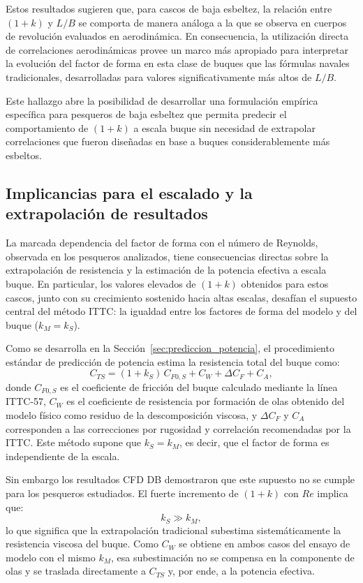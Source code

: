 Estos resultados sugieren que, para cascos de baja esbeltez, la relación entre $(1+k)$ y $L/B$ se comporta de manera análoga a la que se observa en cuerpos de revolución evaluados en aerodinámica. En consecuencia, la utilización directa de correlaciones aerodinámicas provee un marco más apropiado para interpretar la evolución del factor de forma en esta clase de buques que las fórmulas navales tradicionales, desarrolladas para valores significativamente más altos de $L/B$.

Este hallazgo abre la posibilidad de desarrollar una formulación empírica específica para pesqueros de baja esbeltez que permita predecir el comportamiento de $(1+k)$ a escala buque sin necesidad de extrapolar correlaciones que fueron diseñadas en base a buques considerablemente más esbeltos.


\subsection{Implicancias para el escalado y la extrapolación de resultados}

La marcada dependencia del factor de forma con el número de Reynolds, 
observada en los pesqueros analizados, tiene consecuencias directas sobre 
la extrapolación de resistencia y la estimación de la potencia efectiva a 
escala buque. En particular, los valores elevados de $(1+k)$ obtenidos para 
estos cascos, junto con su crecimiento sostenido hacia altas escalas, 
desafían el supuesto central del método ITTC: la igualdad entre los factores 
de forma del modelo y del buque ($k_{M} = k_{S}$).

Como se desarrolla en la Sección~\ref{sec:prediccion_potencia}, el 
procedimiento estándar de predicción de potencia \citep{ITTC_Performance_prediction} 
estima la resistencia total del buque como:
%
\begin{equation}
    C_{TS} = (1 + k_S)\,C_{F0,S} + C_W + \Delta C_F + C_A,
\end{equation}
%
donde $C_{F0,S}$ es el coeficiente de fricción del buque calculado mediante 
la línea ITTC-57, $C_W$ es el coeficiente de resistencia por formación de 
olas obtenido del modelo físico como residuo de la descomposición viscosa, 
y $\Delta C_F$ y $C_A$ corresponden a las correcciones por rugosidad y 
correlación recomendadas por la ITTC. Este método supone que $k_S = k_M$, 
es decir, que el factor de forma es independiente de la escala.

Sin embargo los resultados CFD DB demostraron que este supuesto no se 
cumple para los pesqueros estudiados. El fuerte incremento de $(1+k)$ con 
$Re$ implica que:
%
\begin{equation}
    k_S \gg k_M,
\end{equation}
%
lo que significa que la extrapolación tradicional subestima sistemáticamente 
la resistencia viscosa del buque. Como $C_W$ se obtiene en ambos casos del 
ensayo de modelo con el mismo $k_M$, esa subestimación no se compensa en la 
componente de olas y se traslada directamente a $C_{TS}$ y, por ende, a la 
potencia efectiva.

